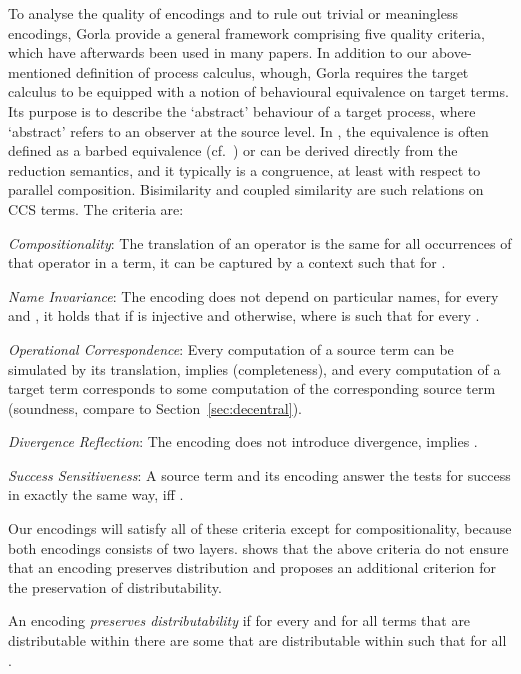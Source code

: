 \documentclass[copyright,creativecommons]{eptcs}
\begin{document}
To analyse the quality of encodings and to rule out trivial or meaningless encodings, Gorla \cite{gorla10} provide a general framework comprising five quality criteria, which have afterwards been used in many papers.
In addition to our above-mentioned definition of process calculus, whough, Gorla requires the target calculus to be equipped with a notion of behavioural equivalence  on target terms. 
Its purpose is to describe the `abstract' behaviour of a target process, where `abstract' refers to an observer at the source level. 
In \cite{gorla10}, the equivalence  is often defined as a barbed equivalence (cf.~\cite{milner.sangiorgi:barbed-bisimulation}) or can be derived directly from the reduction semantics, and it typically is a congruence, at least with respect to parallel composition. 
Bisimilarity and coupled similarity are such relations on CCS terms.
The criteria are:
\begin{compactenum}[(1)]
	\item \emph{Compositionality}: The translation of an operator  is the same for all occurrences of that operator in a term, \ie it can be captured by a context  such that  for .
	\item \emph{Name Invariance}: The encoding does not depend on particular names, \ie for every  and , it holds that  if  is injective and  otherwise, where  is such that  for every .
	\item \emph{Operational Correspondence}: Every computation of a source term can be simulated by its translation, \ie  implies  (completeness), and every computation of a target term corresponds to some computation of the corresponding source term (soundness, compare to Section~\ref{sec:decentral}). 
	\item \emph{Divergence Reflection}: The encoding does not introduce divergence, \ie  implies .
	\item \emph{Success Sensitiveness}: A source term and its encoding answer the tests for success in exactly the same way, \ie  iff .
\end{compactenum}

Our encodings will satisfy all of these criteria except for compositionality, because both encodings consists of two layers.
\cite{petersNestmannGoltz13} shows that the above criteria do not ensure that an encoding preserves distribution and proposes an additional criterion for the preservation of distributability.

\begin{definition}
	\label{def:distributabilityPreservation}
	
	An encoding  \emph{preserves distributability} if for every  and for all terms  that are distributable within  there are some  that are distributable within  such that  for all .
\end{definition}
\end{document}

